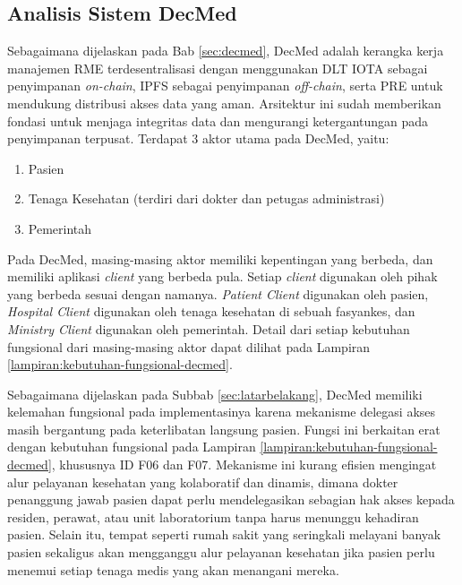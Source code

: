\subsection{Analisis Sistem DecMed}
\label{subsec:analisis-sistem-decmed}

Sebagaimana dijelaskan pada Bab \ref{sec:decmed}, DecMed adalah kerangka kerja manajemen RME terdesentralisasi dengan menggunakan DLT IOTA sebagai penyimpanan \textit{on-chain}, IPFS sebagai penyimpanan \textit{off-chain}, serta PRE untuk mendukung distribusi akses data yang aman. Arsitektur ini sudah memberikan fondasi untuk menjaga integritas data dan mengurangi ketergantungan pada penyimpanan terpusat. Terdapat 3 aktor utama pada DecMed, yaitu:

\begin{enumerate}
    \item Pasien
    \item Tenaga Kesehatan (terdiri dari dokter dan petugas administrasi)
    \item Pemerintah
\end{enumerate}

Pada DecMed, masing-masing aktor memiliki kepentingan yang berbeda, dan memiliki aplikasi \textit{client} yang berbeda pula. Setiap \textit{client} digunakan oleh pihak yang berbeda sesuai dengan namanya. \textit{Patient Client} digunakan oleh pasien, \textit{Hospital Client} digunakan oleh tenaga kesehatan di sebuah fasyankes, dan \textit{Ministry Client} digunakan oleh pemerintah. Detail dari setiap kebutuhan fungsional dari masing-masing aktor dapat dilihat pada Lampiran \ref{lampiran:kebutuhan-fungsional-decmed}.


Sebagaimana dijelaskan pada Subbab \ref{sec:latarbelakang}, DecMed memiliki kelemahan fungsional pada implementasinya karena mekanisme delegasi akses masih bergantung pada keterlibatan langsung pasien. Fungsi ini berkaitan erat dengan kebutuhan fungsional pada Lampiran \ref{lampiran:kebutuhan-fungsional-decmed}, khususnya ID F06 dan F07. Mekanisme ini kurang efisien mengingat alur pelayanan kesehatan yang kolaboratif dan dinamis, dimana dokter penanggung jawab pasien dapat perlu mendelegasikan sebagian hak akses kepada residen, perawat, atau unit laboratorium tanpa harus menunggu kehadiran pasien. Selain itu, tempat seperti rumah sakit yang seringkali melayani banyak pasien sekaligus akan mengganggu alur pelayanan kesehatan jika pasien perlu menemui setiap tenaga medis yang akan menangani mereka.



